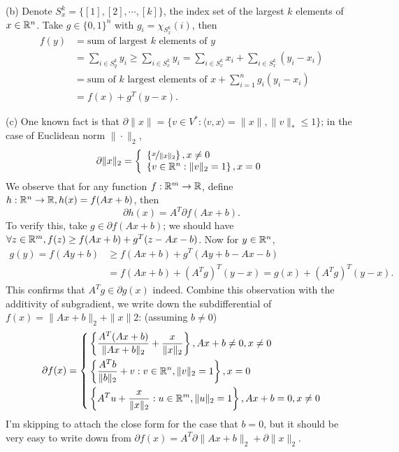 \documentclass[12pt,a4paper]{article}
\newcommand{\ra}[1]{\ifnum #1=1\rightarrow\fi\ifnum #1=2\Rightarrow\fi\ifnum #1=3\Rrightarrow\fi\ifnum #1=4\rightrightarrows\fi\ifnum #1=5\rightleftarrows\fi\ifnum #1=6\mapsto\fi\ifnum #1=7\iffalse\fi\fi\ifnum #1=8\twoheadrightarrow\fi\ifnum #1=9\rightharpoonup\fi\ifnum #1=0\rightharpoondown\fi}
\renewcommand{\l}{\left}\renewcommand{\r}{\right}
\newcommand{\SUM}[2]{\sum\limits_{#1}^{#2}}
\def\R{\ifmmode\mathbb R\fi}
\begin{document}
\noindent(b) Denote $S_x^k = \{ [1], [2], \cdots, [k]\}$, the index set of the largest $k$ elements of $x\in\R^n$. Take $g\in\{0, 1\}^n$ with $g_i = \chi_{S_x^k}(i)$, then
\begin{align*}
  f(y) &= \mbox{sum of largest $k$ elements of $y$} \\
       &= \SUM{i\in S_y^k}{} y_i \geq \SUM{i\in S_x^k}{} y_i = \SUM{i\in S_x^k}{} x_i + \SUM{i\in S_x^k}{} (y_i - x_i) \\
       &= \mbox{sum of $k$ largest elements of $x$} + \SUM{i=1}n g_i(y_i - x_i) \\
       &= f(x) + g^T(y-x).
\end{align*}

\noindent(c) One known fact is that $\partial \|x\| = \{v \in V^\ast : \langle v, x \rangle = \|x\|, \|v\|_\ast \leq 1\}$; in the case of Euclidean norm $\|\cdot\|_2$, 
\begin{equation*}
  \partial \|x\|_2 = \l\{
    \begin{array}{l}
      \l\{\nicefrac x{\|x\|_2}\r\}, x \neq 0 \\
      \l\{v \in \R^n : \|v\|_2 = 1\r\}, x = 0
    \end{array}
    \r.
\end{equation*}
We observe that for any function $f: \R^m \ra1 \R$, define $h: \R^n \ra1 \R, h(x) = f(Ax+b)$, then
$$\partial h(x) = A^T \partial f(Ax + b).$$
To verify this, take $g\in \partial f(Ax + b)$; we should have $\forall z\in\R^m, f(z) \geq f(Ax+b) + g^T(z-Ax-b)$. Now for $y\in \R^n$, 
\begin{align*}
  g(y) = f(Ay+b) & \geq f(Ax+b) + g^T(Ay+b - Ax-b) \\
                 & = f(Ax+b) + (A^Tg)^T(y-x) = g(x) + (A^Tg)^T(y-x).
\end{align*}
This confirms that $A^Tg \in \partial g(x)$ indeed. Combine this observation with the additivity of subgradient, we write down the subdifferential of $f(x) = \|Ax+b\|_2 + \|x\|2$: (assuming $b\neq 0$)
$$\partial f(x) = \l\{
  \begin{align*}
    &\l\{\frac{A^T(Ax+b)}{\|Ax+b\|_2} + \frac{x}{\|x\|_2}\r\}, Ax+b \neq 0, x\neq 0 \\
    &\l\{\frac{A^Tb}{\|b\|_2} + v : v\in\R^n, \|v\|_2 = 1\r\}, x = 0\\
    &\l\{A^Tu + \frac{x}{\|x\|_2} : u \in \R^m, \|u\|_2 = 1 \r\}, Ax+b = 0, x \neq 0
  \end{align*}
  \r.$$
I'm skipping to attach the close form for the case that $b= 0$, but it should be very easy to write down from $\partial f(x) = A^T\partial \|Ax+b\|_2 + \partial \|x\|_2$. \\
\\
\end{document}
